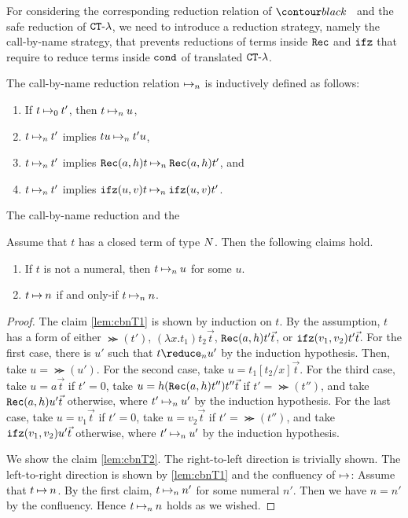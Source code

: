 For considering the corresponding reduction relation of $\systemT$ and the safe reduction of ${ {\tt CT} \mbox{-} \lambda}$,
we need to introduce a reduction strategy, namely the call-by-name strategy,
that prevents reductions of terms inside ${\tt Rec}$ and ${\tt ifz}$ that require
to reduce terms inside ${\tt cond}$ of translated ${ {\tt CT} \mbox{-} \lambda}$. 

\begin{definition}
  The call-by-name reduction relation $\mathbin{\mapsto}_n$ is inductively defined as follows:
  \begin{enumerate}
  \item
    If $t \mathbin{\mapsto}_0 t'$, then $t \mathbin{\mapsto}_n u$, 
  \item
    $t \mathbin{\mapsto}_n t'$ implies $tu \mathbin{\mapsto}_n t'u$,
  \item
    $t \mathbin{\mapsto}_n t'$ implies ${\tt Rec}(a,h)t \mathbin{\mapsto}_n {\tt Rec}(a,h)t'$, and 
  \item
    $t \mathbin{\mapsto}_n t'$ implies ${\tt ifz}(u,v)t \mathbin{\mapsto}_n {\tt ifz}(u,v)t'$. 
  \end{enumerate}
\end{definition}

The call-by-name reduction and the 

\begin{lemma}\label{lem:cbnT}
  Assume that $t$ has a closed term of type ${N}$. Then the following claims hold. 
  \begin{enumerate}
  \item\label{lem:cbnT1}
    If $t$ is not a numeral, then $t \mathbin{\mapsto}_n u$ for some $u$. 
  \item\label{lem:cbnT2}
    $t\mathbin{\mapsto} n$ if and only-if $t \mathbin{\mapsto}_n n$.
  \end{enumerate}
\end{lemma}
\begin{proof}
  The claim \ref{lem:cbnT1} is shown by induction on $t$. 
  By the assumption, $t$ has a form of either $\Succ(t')$, $(\lambda x.t_1)t_2\vec{t}$,
  ${\tt Rec}(a,h)t'\vec{t}$, or ${\tt ifz}(v_1,v_2)t'\vec{t}$.
  For the first case, there is $u'$ such that $t\reduce_n u'$ by the induction hypothesis. 
  Then, take $u = \Succ(u')$.
  For the second case, take $u = t_1[t_2/x]\vec{t}$.
  For the third case, take $u = a\vec{t}$ if $t'=0$, take $u=h({\tt Rec}(a,h)t'')t''\vec{t}$ if $t'=\Succ(t'')$, and
  take ${\tt Rec}(a,h)u'\vec{t}$ otherwise, where $t'\mathbin{\mapsto}_n u'$ by the induction hypothesis.
  For the last case, take $u = v_1\vec{t}$ if $t'=0$, take $u=v_2\vec{t}$ if $t'=\Succ(t'')$, and
  take ${\tt ifz}(v_1,v_2)u'\vec{t}$ otherwise, where $t'\mathbin{\mapsto}_n u'$ by the induction hypothesis.

  We show the claim \ref{lem:cbnT2}.
  The right-to-left direction is trivially shown. The left-to-right direction 
  is shown by \ref{lem:cbnT1} and the confluency of $\mathbin{\mapsto}$: 
  Assume that $t\mathbin{\mapsto} n$. By the first claim, $t \mathbin{\mapsto}_n n'$ for some numeral $n'$.
  Then we have $n=n'$ by the confluency. Hence $t\mathbin{\mapsto}_n n$ holds as we wished. 
\end{proof}

